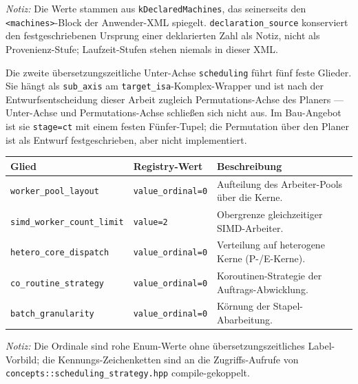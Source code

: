 \emph{Notiz:} Die Werte stammen aus \texttt{k\allowbreak{}Declared\allowbreak{}Machines}, das seinerseits den \texttt{<machines>}-Block der Anwender-XML spiegelt. \texttt{declaration\_\allowbreak{}source} konserviert den festgeschriebenen Ursprung einer deklarierten Zahl als Notiz, nicht als Provenienz-Stufe; Laufzeit-Stufen stehen niemals in dieser XML\@.

Die zweite übersetzungszeitliche Unter-Achse \texttt{scheduling} führt fünf feste Glieder. Sie hängt als \texttt{sub\_\allowbreak{}axis} am \texttt{target\_\allowbreak{}isa}-Komplex-Wrapper und ist nach der Entwurfsentscheidung dieser Arbeit zugleich Permutations-Achse des Planers --- Unter-Achse und Permutations-Achse schließen sich nicht aus. Im Bau-Angebot ist sie \texttt{stage=ct} mit einem festen Fünfer-Tupel; die Permutation über den Planer ist als Entwurf festgeschrieben, aber nicht implementiert.

\begin{scriptsize}
\begin{longtable}{@{}>{\raggedright\arraybackslash}p{4.0cm} >{\raggedright\arraybackslash}p{2.4cm} >{\raggedright\arraybackslash}p{7.1cm}@{}}
\toprule
Glied & Registry-Wert & Beschreibung \\
\midrule
\endhead%
\texttt{worker\_\allowbreak{}pool\_\allowbreak{}layout} & \texttt{value\_\allowbreak{}ordinal=0} & Aufteilung des Arbeiter-Pools über die Kerne. \\
\texttt{simd\_\allowbreak{}worker\_\allowbreak{}count\_\allowbreak{}limit} & \texttt{value=2} & Obergrenze gleichzeitiger SIMD-Arbeiter. \\
\texttt{hetero\_\allowbreak{}core\_\allowbreak{}dispatch} & \texttt{value\_\allowbreak{}ordinal=0} & Verteilung auf heterogene Kerne (P-/\allowbreak{}E-Kerne). \\
\texttt{co\_\allowbreak{}routine\_\allowbreak{}strategy} & \texttt{value\_\allowbreak{}ordinal=0} & Koroutinen-Strategie der Auftrags-Abwicklung. \\
\texttt{batch\_\allowbreak{}granularity} & \texttt{value\_\allowbreak{}ordinal=0} & Körnung der Stapel-Abarbeitung. \\
\bottomrule
\end{longtable}
\end{scriptsize}

\emph{Notiz:} Die Ordinale sind rohe Enum-Werte ohne übersetzungszeitliches Label-Vorbild; die Kennungs-Zeichenketten sind an die Zugriffs-Aufrufe von \texttt{concepts::\allowbreak{}scheduling\_\allowbreak{}strategy.hpp} compile-gekoppelt.

